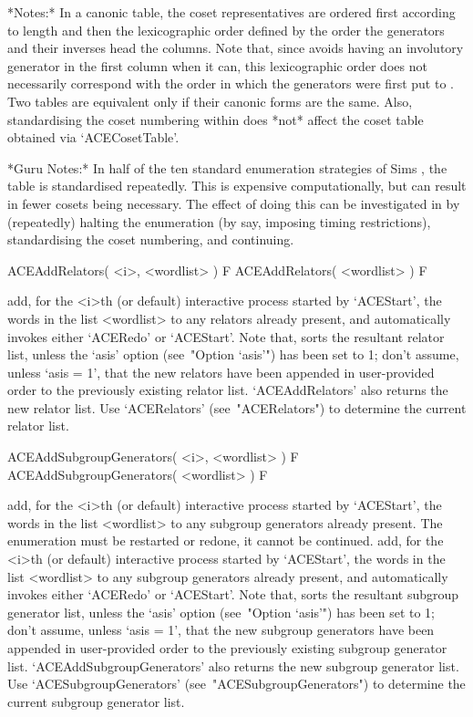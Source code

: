 *Notes:*
In a canonic  table,  the  coset  representatives  are  ordered  first
according to length and then the lexicographic order  defined  by  the
order the generators and their inverses head the columns.  Note  that,
since {\ACE} avoids having an involutory generator in the first column
when it can, this lexicographic order does not necessarily  correspond
with the order in which the generators were first put to  {\ACE}.  Two
tables are equivalent only if their canonic forms are the same.  Also,
standardising the coset numbering within {\ACE} does *not* affect  the
{\GAP} coset table obtained via `ACECosetTable'.

*Guru Notes:*
In  half  of  the  ten  standard  enumeration   strategies   of   Sims
\cite{Sim94}, the table is standardised repeatedly. This is  expensive
computationally, but can result in fewer cosets being  necessary.  The
effect of doing this can be investigated  in  {\ACE}  by  (repeatedly)
halting  the  enumeration  (by  say,  imposing  timing  restrictions),
standardising the coset numbering, and continuing.

\>ACEAddRelators( <i>, <wordlist> ) F
\>ACEAddRelators( <wordlist> ) F

add, for the <i>th (or default) interactive {\ACE} process started  by
`ACEStart', the words in the list <wordlist> to any  relators  already
present, and automatically invokes  either  `ACERedo'  or  `ACEStart'.
Note that, {\ACE} sorts the resultant relator list, unless the  `asis'
option (see~"Option `asis'") has been set to 1; don't  assume,  unless
`asis = 1', that the new relators have been appended in  user-provided
order to the previously existing relator list.  `ACEAddRelators'  also
returns the new relator list. Use `ACERelators' (see~"ACERelators") to
determine the current relator list.

\>ACEAddSubgroupGenerators( <i>, <wordlist> ) F
\>ACEAddSubgroupGenerators( <wordlist> ) F

add, for the <i>th (or default) interactive {\ACE} process started  by
`ACEStart',  the  words  in  the  list  <wordlist>  to  any   subgroup
generators already present.  The  enumeration  must  be  restarted  or
redone, it cannot be  continued.  add,  for  the  <i>th  (or  default)
interactive {\ACE} process started by `ACEStart',  the  words  in  the
list <wordlist>  to  any  subgroup  generators  already  present,  and
automatically invokes  either  `ACERedo'  or  `ACEStart'.  Note  that,
{\ACE} sorts the resultant subgroup generator list, unless the  `asis'
option (see~"Option `asis'") has been set to 1; don't  assume,  unless
`asis = 1', that the new subgroup generators  have  been  appended  in
user-provided order to  the  previously  existing  subgroup  generator
list.  `ACEAddSubgroupGenerators'  also  returns  the   new   subgroup
generator          list.          Use          `ACESubgroupGenerators'
(see~"ACESubgroupGenerators")  to  determine  the   current   subgroup
generator list.

